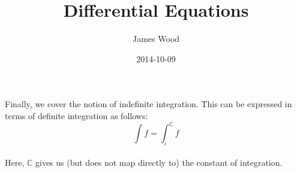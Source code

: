 \message{ !name(de.tex)}\documentclass[11pt]{article}
\title{\textbf{Differential Equations}}
\author{James Wood}
\date{2014-10-09}
\newcommand*\C{\ensuremath{\mathbb C}}
\newcommand*\id{\iota}
\newcommand*\prg{\paragraph}
\begin{document}

\prg{}Finally, we cover the notion of indefinite integration. This can be expressed in terms of definite integration as follows:
\[
\int f=\int^\C_\id f
\]
\prg{}Here, $\C$ gives us (but does not map directly to) the constant of integration.
\end{document}

